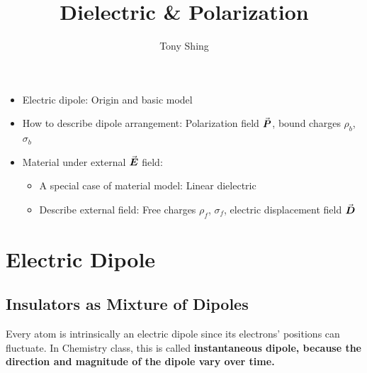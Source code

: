 \documentclass[class=article, crop=false, 12pt]{standalone}
\author{Tony Shing}
\title{Dielectric \& Polarization}
\begin{document}
\maketitle


\begin{overview}
    \begin{itemize}
        \item Electric dipole: Origin and basic model
        \item How to describe dipole arrangement: Polarization field $\va*{P}$, bound charges $\rho_b$, $\sigma_b$
        \item Material under external $\va*{E}$ field: 
        \begin{itemize}
            \item A special case of material model: {Linear dielectric} 
            \item Describe external field: Free charges $\rho_f$, $\sigma_f$, electric displacement field $\va*{D}$
        \end{itemize}
    \end{itemize}
\end{overview}




\section{Electric Dipole}

\subsection{Insulators as Mixture of Dipoles}

Every atom is intrinsically an electric dipole since its electrons' positions can fluctuate. 
In Chemistry class, this is called \bf{instantaneous dipole},
because the direction and magnitude of the dipole vary over time.
\end{document}
